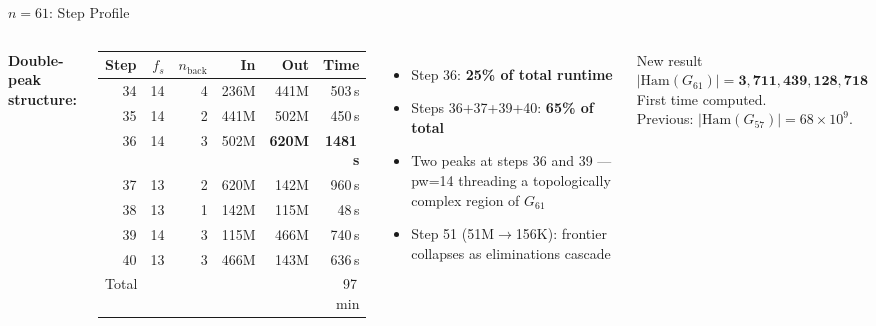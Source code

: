 \documentclass[aspectratio=169,t]{beamer}
\newcommand{\nb}{n_{\mathrm{back}}}
\begin{document}
\begin{frame}{$n=61$: Step Profile}
\small
\begin{columns}[c]
\textbf{Double-peak structure:}

\vspace{0.1cm}
\begin{center}
\footnotesize
\begin{tabular}{rrrrrr}
\toprule
Step & $f_s$ & $\nb$ & In & Out & Time \\
\midrule
34 & 14 & 4 & 236M & 441M & 503\,s \\
\rowcolor{accent!15}
35 & 14 & 2 & 441M & 502M & 450\,s \\
\rowcolor{accent!20}
36 & 14 & 3 & 502M & \textbf{620M} & \textbf{1481\,s} \\
37 & 13 & 2 & 620M & 142M & 960\,s \\
38 & 13 & 1 & 142M & 115M & 48\,s \\
\rowcolor{accent!15}
39 & 14 & 3 & 115M & 466M & 740\,s \\
40 & 13 & 3 & 466M & 143M & 636\,s \\
\midrule
\multicolumn{5}{l}{Total} & 97\,min \\
\bottomrule
\end{tabular}
\end{center}

\begin{itemize}
  \item Step 36: \textbf{25\% of total runtime}
  \item Steps 36+37+39+40: \textbf{65\% of total}
  \item Two peaks at steps 36 and 39 — pw=14 threading a topologically complex region of $G_{61}$
  \item Step 51 (51M$\to$156K): frontier collapses as eliminations cascade
\end{itemize}

\vspace{0.15cm}
\begin{block}{New result}
  $|\mathrm{Ham}(G_{61})| = \mathbf{3{,}711{,}439{,}128{,}718}$\\[2pt]
  First time computed.\\
  Previous: $|\mathrm{Ham}(G_{57})| = 68\times10^9$.
\end{block}
\end{columns}
\end{frame}
\end{document}
